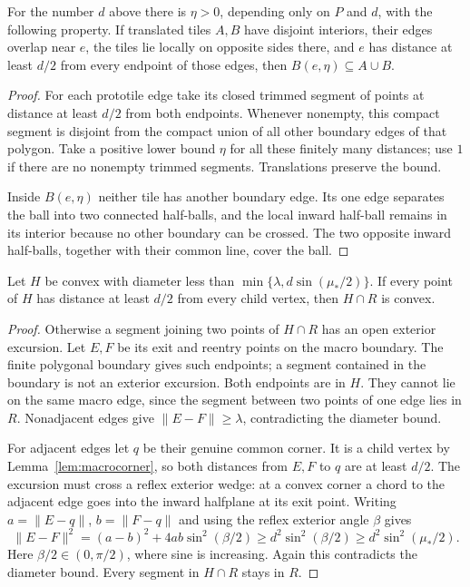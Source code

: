 \begin{lemma}
\label{lem:trimmed-edge-ball}
For the number $d$ above there is $\eta>0$, depending only on $P$ and
$d$, with the following property.  If translated tiles $A,B$ have
disjoint interiors, their edges overlap near $e$, the tiles lie locally
on opposite sides there, and $e$ has distance at least $d/2$ from every
endpoint of those edges, then $B(e,\eta)\subseteq A\cup B$.
\end{lemma}
\begin{proof}
For each prototile edge take its closed trimmed segment of points at
distance at least $d/2$ from both endpoints.  Whenever nonempty, this
compact segment is disjoint from the compact union of all other boundary
edges of that polygon.  Take a positive lower bound $\eta$ for all these
finitely many distances; use $1$ if there are no nonempty trimmed
segments.  Translations preserve the bound.

Inside $B(e,\eta)$ neither tile has another boundary edge.  Its one edge
separates the ball into two connected half-balls, and the local inward
half-ball remains in its interior because no other boundary can be
crossed.  The two opposite inward half-balls, together with their common
line, cover the ball.
\end{proof}

\begin{lemma}
\label{lem:exterior-excursion}
Let $H$ be convex with diameter less than
$\min\{\lambda,d\sin(\mu_*/2)\}$.  If every point of $H$ has distance
at least $d/2$ from every child vertex, then $H\cap R$ is convex.
\end{lemma}
\begin{proof}
Otherwise a segment joining two points of $H\cap R$ has an open exterior
excursion.  Let $E,F$ be its exit and reentry points on the macro boundary.
The finite polygonal boundary gives such endpoints; a segment contained
in the boundary is not an exterior excursion.  Both endpoints are in $H$.
They cannot lie on the same macro edge, since the segment between two
points of one edge lies in $R$.  Nonadjacent edges give
$\lVert E-F\rVert\ge\lambda$, contradicting the diameter bound.

For adjacent edges let $q$ be their genuine common corner.  It is a child
vertex by Lemma~\ref{lem:macrocorner}, so both distances from $E,F$ to
$q$ are at least $d/2$.  The excursion must cross a reflex exterior
wedge: at a convex corner a chord to the adjacent edge goes into the
inward halfplane at its exit point.  Writing $a=\lVert E-q\rVert$,
$b=\lVert F-q\rVert$ and using the reflex exterior angle $\beta$ gives
\[
 \lVert E-F\rVert^2=(a-b)^2+4ab\sin^2(\beta/2)
       \ge d^2\sin^2(\beta/2)
       \ge d^2\sin^2(\mu_*/2).
\]
Here $\beta/2\in(0,\pi/2)$, where sine is increasing.  Again this
contradicts the diameter bound.  Every segment in $H\cap R$ stays in $R$.
\end{proof}


